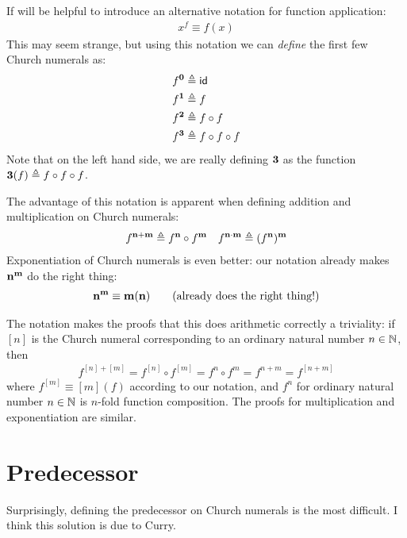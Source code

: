 If will be helpful to introduce an alternative notation for function application:
\begin{align*}
  x^f \equiv f(x)
\end{align*}
This may seem strange, but using this notation we can \emph{define} the first few Church numerals as:
\begin{align*}
  f^{\mathbf{0}} &\triangleq{} \mathsf{id}\\
  f^{\mathbf{1}} &\triangleq{} f \\
  f^{\mathbf{2}} &\triangleq{} f \circ f\\
  f^{\mathbf{3}} &\triangleq{} f \circ f \circ f
\end{align*}
Note that on the left hand side, we are really defining $\mathbf{3}$ as the function $\mathbf{3}(f) \triangleq{} f \circ f \circ f$.

The advantage of this notation is apparent when defining addition and multiplication on Church numerals:
\begin{align*}
  f^{\mathbf{n}+\mathbf{m}} \triangleq{} f^{\mathbf{n}} \circ f^{\mathbf{m}} &&
  f^{\mathbf{n}\cdot\mathbf{m}} \triangleq{} (f^{\mathbf{n}})^{\mathbf{m}}
\end{align*}
Exponentiation of Church numerals is even better: our notation already makes $\mathbf{n}^{\mathbf{m}}$ do the right thing:
\begin{align*}
  \mathbf{n}^{\mathbf{m}} \equiv \mathbf{m}(\mathbf{n}) \tag{already does the right thing!}
\end{align*}

The notation makes the proofs that this does arithmetic correctly a triviality: if $[n]$ is the Church numeral corresponding to an ordinary natural number $n \in \mathbb{N}$, then
\begin{align*}
  f^{[n]+[m]} = f^{[n]} \circ f^{[m]} = f^n \circ f^m = f^{n+m} = f^{[n+m]}
\end{align*}
where $f^{[m]} \equiv [m](f)$ according to our notation, and $f^n$ for ordinary natural number $n \in \mathbb{N}$ is $n$-fold function composition.
The proofs for multiplication and exponentiation are similar.

\section{Predecessor}
Surprisingly, defining the predecessor on Church numerals is the most difficult. I think this solution is due to Curry.

